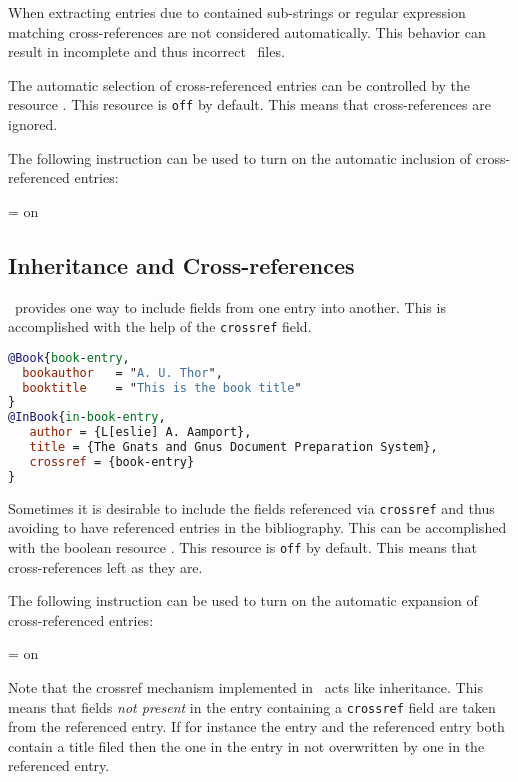 \documentclass[11pt,a4paper]{scrbook}
\begin{document}
When extracting entries due to contained sub-strings or regular expression
matching cross-references are not considered automatically. This behavior can
result in incomplete and thus incorrect \BibTeX\ files.

The automatic selection of cross-referenced entries can be controlled by the
resource . This resource is \texttt{off} by default.
This means that cross-references are ignored.

The following instruction can be used to turn on the automatic inclusion of
cross-referenced entries:

\begin{Resources}
   = on
\end{Resources}

\subsection{Inheritance and Cross-references}\label{sec:inherit}

\BibTeX\ provides one way to include fields from one entry into another. This
is accomplished with the help of the \texttt{crossref} field.

\begin{lstlisting}[language=BibTeX]
@Book{book-entry,
  bookauthor   = "A. U. Thor",
  booktitle    = "This is the book title"
}
@InBook{in-book-entry,
   author = {L[eslie] A. Aamport},
   title = {The Gnats and Gnus Document Preparation System},
   crossref = {book-entry}
}
\end{lstlisting}

Sometimes it is desirable to include the fields referenced via
\texttt{crossref} and thus avoiding to have referenced entries in the
bibliography. This can be accomplished with the boolean resource
. This resource is \texttt{off} by default. This means
that cross-references left as they are.

The following instruction can be used to turn on the automatic expansion of
cross-referenced entries:

\begin{Resources}
   = on
\end{Resources}

Note that the crossref mechanism implemented in \BibTool\ acts like
inheritance. This means that fields \emph{not present} in the entry containing
a \texttt{crossref} field are taken from the referenced entry. If for instance
the entry and the referenced entry both contain a title filed then the one in
the entry in not overwritten by one in the referenced entry.
\end{document}

